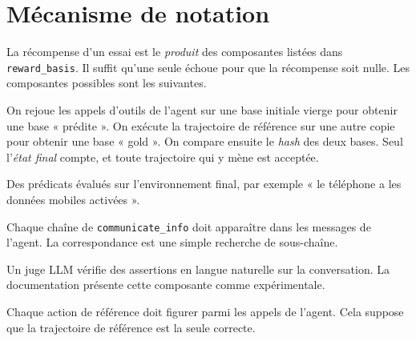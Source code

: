 \section{Mécanisme de notation}
\label{sec:evaluation}

La récompense d'un essai est le \emph{produit} des composantes listées dans \texttt{reward\_basis}. Il suffit qu'une seule échoue pour que la récompense soit nulle. Les composantes possibles sont les suivantes.

\begin{description}[nosep]
  \item[\texttt{DB}] On rejoue les appels d'outils de l'agent sur une base initiale vierge pour obtenir une base « prédite ». On exécute la trajectoire de référence sur une autre copie pour obtenir une base « gold ». On compare ensuite le \emph{hash} des deux bases. Seul l'\emph{état final} compte, et toute trajectoire qui y mène est acceptée.
  \item[\texttt{ENV\_ASSERTION}] Des prédicats évalués sur l'environnement final, par exemple « le téléphone a les données mobiles activées ».
  \item[\texttt{COMMUNICATE}] Chaque chaîne de \texttt{communicate\_info} doit apparaître dans les messages de l'agent. La correspondance est une simple recherche de sous-chaîne.
  \item[\texttt{NL\_ASSERTION}] Un juge LLM vérifie des assertions en langue naturelle sur la conversation. La documentation présente cette composante comme expérimentale.
  \item[\texttt{ACTION}] Chaque action de référence doit figurer parmi les appels de l'agent. Cela suppose que la trajectoire de référence est la seule correcte.
\end{description}

